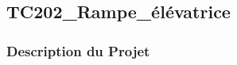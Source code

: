 \documentclass[a4paper,12pt]{report}
\begin{document}
\newpage
\subsection{TC202\_Rampe\_élévatrice}
\begin{center}
\label{}
\end{center}
\subsubsection{Description du Projet}
\end{document}

